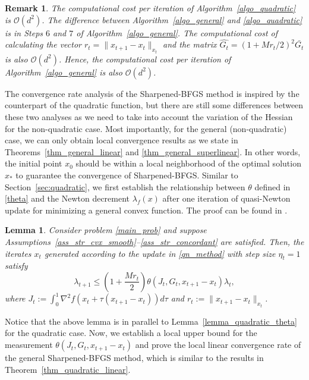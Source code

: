 \documentclass[11pt]{article}
\numberwithin{assumption}{section}
\newtheorem{remark}{Remark}
\numberwithin{remark}{section}
\numberwithin{theorem}{section}
\newtheorem{lemma}[theorem]{Lemma}
\begin{document}
\begin{remark}\label{remark_5}
The computational cost per iteration of Algorithm~\ref{algo_quadratic} is $\mathcal{O}(d^2)$. The difference between Algorithm~\ref{algo_general} and \ref{algo_quadratic} is in Steps $6$ and $7$ of Algorithm~\ref{algo_general}. The computational cost of calculating the vector $r_t = \|x_{t + 1} - x_{t}\|_{x_t}$ and the matrix $\hat{G_t} = (1 + {Mr_t}/{2})^2\bar{G_t}$ is also $\mathcal{O}(d^2)$. Hence, the computational cost per iteration of Algorithm~\ref{algo_general} is also $\mathcal{O}(d^2)$.
\end{remark}

The convergence rate analysis of the Sharpened-BFGS method is inspired by the counterpart of the quadratic function, but there are still some differences between these two analyses as we need to take into account the variation of the Hessian for the non-quadratic case. Most importantly, for the general (non-quadratic) case, we can only obtain  local convergence results as we state in  Theorems~\ref{thm_general_linear} and \ref{thm_general_superlinear}. In other words, the initial point $x_0$ should be within a local neighborhood of the optimal solution $x_*$ to guarantee the  convergence of Sharpened-BFGS.
Similar to Section~\ref{sec:quadratic}, we first establish the relationship between $\theta$ defined in \eqref{theta} and the Newton decrement $\lambda_f(x)$ after one iteration of quasi-Newton update for minimizing a general convex function. The proof can be found in \cite{rodomanov2020rates}.

\begin{lemma}\label{lemma_general_theta}
Consider problem \eqref{main_prob} and suppose Assumptions~\ref{ass_str_cvx_smooth}--\ref{ass_str_concordant} are satisfied. Then, the iterates $x_t$ generated according to the update in \eqref{qn_method} with step size $\eta_t=1$ satisfy
\begin{equation}\label{lemma_general_theta_1}
    \lambda_{t+1} \leq \left(1 + \frac{Mr_t}{2}\right)\theta(J_t, G_t, x_{t + 1} - x_{t})\lambda_t,
\end{equation}
where $J_t := \int_{0}^{1}\nabla^2{f(x_t + \tau(x_{t + 1} - x_{t}))d\tau}$ and $r_t := \|x_{t+1} - x_t\|_{x_t}$. 
\end{lemma}

Notice that the above lemma is in parallel to Lemma~\ref{lemma_quadratic_theta} for the quadratic case. Now, we establish a local upper bound for the measurement $\theta(J_t, G_t, x_{t + 1} - x_{t})$ and prove the local linear convergence rate of the general Sharpened-BFGS method, which is similar to the results in Theorem~\ref{thm_quadratic_linear}.
\end{document}
